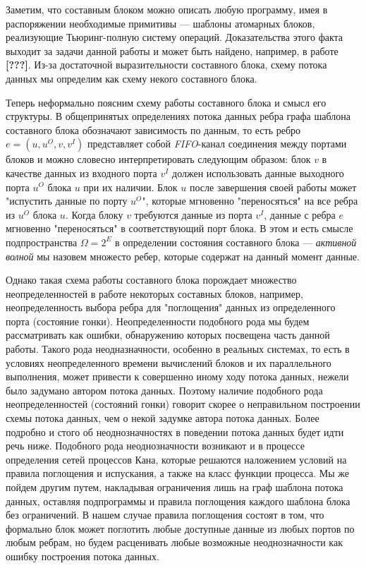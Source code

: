 \documentclass[10pt,a4paper]{article}
\begin{document}
Заметим, что составным блоком можно описать любую программу, имея в распоряжении необходимые примитивы --- шаблоны атомарных блоков,
реализующие Тьюринг-полную систему операций. Доказательства этого факта выходит за задачи данной работы и может быть найдено, например, в работе \textbf{[???]}.
Из-за достаточной выразительности составного блока, схему потока данных мы определим как схему некого составного блока.

Теперь неформально поясним схему работы составного блока и смысл его структуры.
В общепринятых определениях потока данных ребра графа шаблона составного блока обозначают зависимость по данным, то есть ребро $e = (u, u^O, v, v^I)$ представляет собой
\textit{FIFO}-канал соединения между портами блоков и
можно словесно интерпретировать следующим образом: блок $v$ в качестве данных из входного порта $v^I$ должен использовать данные выходного порта $u^O$ блока $u$ при их наличии.
Блок $u$ после завершения своей работы может "испустить данные по порту $u^O$", которые мгновенно "переносяться" на все ребра из $u^O$ блока $u$.
Когда блоку $v$ требуются данные из порта $v^I$, данные с ребра $e$ мгновенно "переносяться" в соответствующий порт блока. В этом и есть смысле подпространства $\Omega = 2^E$
в определении состояния составного блока --- \textit{активной волной} мы назовем множесто ребер, которые содержат на данный момент данные.

Однако такая схема работы составного блока порождает множество неопределенностей в работе некоторых составных блоков, например, неопределенность выбора ребра для "поглощения" данных из определенного порта (состояние гонки).
Неопределенности подобного рода мы будем рассматривать как ошибки, обнаружению которых посвещена часть данной работы. Такого рода неодназначности, особенно в реальных системах,
то есть в условиях неопределенного времени вычислений блоков и их параллельного выполнения, может привести к совершенно иному ходу потока данных, нежели было задумано автором потока данных. Поэтому наличие подобного рода неопределенностей (состояний гонки) говорит скорее о неправильном построении схемы потока данных, чем о некой задумке автора потока данных. Более подробно и стого об неоднозначностях в поведении потока данных будет идти речь ниже. Подобного рода неоднозначности возникают и в процессе определения сетей процессов Кана, которые решаются наложением условий на правила поглощения и испускания, а также на класс функции процесса.
Мы же пойдем другим путем, накладывая ограничения лишь на граф шаблона потока данных, оставляя подпрограммы и правила поглощения каждого шаблона блока без ограничений.
В нашем случае правила поглощения состоят в том, что формально блок может поглотить любые доступные данные из любых портов по любым ребрам, но будем расценивать любые возможные неоднозначности как ошибку построения потока данных.
\end{document}

